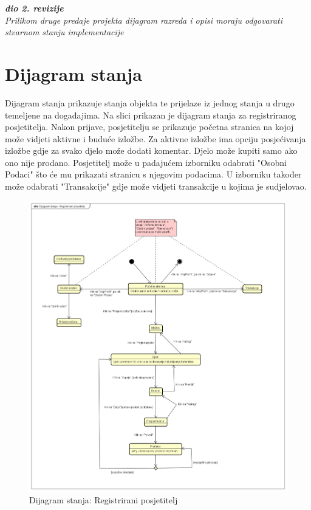 {\begin{figure}[H]
			\end{figure}
			
			\textbf{\textit{dio 2. revizije}}\\		
				
			
			
		
			\textit{Prilikom druge predaje projekta dijagram razreda i opisi moraju odgovarati stvarnom stanju implementacije}
			
			
			
			
			\eject
			
		\section{Dijagram stanja}
		
			{Dijagram stanja prikazuje stanja objekta te prijelaze iz jednog stanja u drugo temeljene na događajima. Na slici prikazan je dijagram stanja za registriranog posjetitelja. Nakon prijave, posjetitelju se prikazuje početna stranica na kojoj može vidjeti aktivne i buduće izložbe. Za aktivne izložbe ima opciju posjećivanja izložbe gdje za svako djelo može dodati komentar. Djelo može kupiti samo ako ono nije prodano. Posjetitelj može u padajućem izborniku odabrati "Osobni Podaci" što će mu prikazati stranicu s njegovim podacima. U izborniku također može odabrati "Transakcije" gdje može vidjeti transakcije u kojima je sudjelovao.}
			
			\begin{figure}[H]
				
				\includegraphics[width=\textwidth,height=\textheight,keepaspectratio]{dijagram_stanja}
				\caption{\newline Dijagram stanja: Registrirani posjetitelj}
				

\end{figure}}
